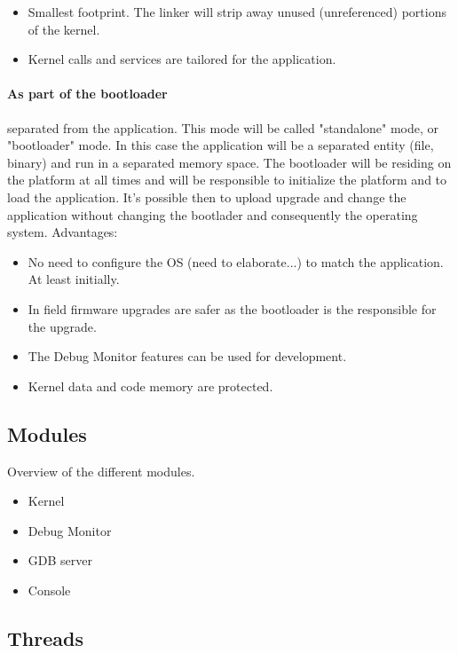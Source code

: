 \begin{itemize}
\item Smallest footprint. The linker will strip away unused (unreferenced) portions of the kernel.
\item Kernel calls and services are tailored for the application.
\end{itemize}
	
\paragraph{As part of the bootloader}{ separated from the application. This mode will be called "standalone" mode, or "bootloader" mode.
In this case the application will be a separated entity (file, binary) and run in a separated memory space. The bootloader will be residing on the platform at all times and will be responsible to initialize the platform and to load the application. It's possible then to upload upgrade and change the application without changing the bootlader and consequently the operating system. Advantages:}

\begin{itemize}
\item No need to configure the OS (need to elaborate...) to match the application. At least initially.
\item In field firmware upgrades are safer as the bootloader is the responsible for the upgrade.
\item The Debug Monitor features can be used for development.
\item Kernel data and code memory are protected.
\end{itemize}

\subsection{Modules}
 Overview of the different modules.
\begin{itemize}
\item Kernel
\item Debug Monitor
\item GDB server
\item Console
\end{itemize}


\subsection{Threads}

